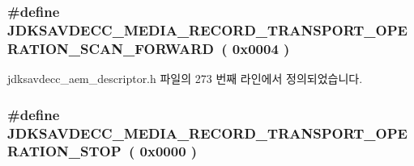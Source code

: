 \subsubsection[{\texorpdfstring{J\+D\+K\+S\+A\+V\+D\+E\+C\+C\+\_\+\+M\+E\+D\+I\+A\+\_\+\+R\+E\+C\+O\+R\+D\+\_\+\+T\+R\+A\+N\+S\+P\+O\+R\+T\+\_\+\+O\+P\+E\+R\+A\+T\+I\+O\+N\+\_\+\+S\+C\+A\+N\+\_\+\+F\+O\+R\+W\+A\+RD}{JDKSAVDECC_MEDIA_RECORD_TRANSPORT_OPERATION_SCAN_FORWARD}}]{\setlength{\rightskip}{0pt plus 5cm}\#define J\+D\+K\+S\+A\+V\+D\+E\+C\+C\+\_\+\+M\+E\+D\+I\+A\+\_\+\+R\+E\+C\+O\+R\+D\+\_\+\+T\+R\+A\+N\+S\+P\+O\+R\+T\+\_\+\+O\+P\+E\+R\+A\+T\+I\+O\+N\+\_\+\+S\+C\+A\+N\+\_\+\+F\+O\+R\+W\+A\+RD~( 0x0004 )}\hypertarget{group__media__record__transport__operation_gac1908031b1369009b8a76192fbcad065}{}\label{group__media__record__transport__operation_gac1908031b1369009b8a76192fbcad065}


jdksavdecc\+\_\+aem\+\_\+descriptor.\+h 파일의 273 번째 라인에서 정의되었습니다.

\subsubsection[{\texorpdfstring{J\+D\+K\+S\+A\+V\+D\+E\+C\+C\+\_\+\+M\+E\+D\+I\+A\+\_\+\+R\+E\+C\+O\+R\+D\+\_\+\+T\+R\+A\+N\+S\+P\+O\+R\+T\+\_\+\+O\+P\+E\+R\+A\+T\+I\+O\+N\+\_\+\+S\+T\+OP}{JDKSAVDECC_MEDIA_RECORD_TRANSPORT_OPERATION_STOP}}]{\setlength{\rightskip}{0pt plus 5cm}\#define J\+D\+K\+S\+A\+V\+D\+E\+C\+C\+\_\+\+M\+E\+D\+I\+A\+\_\+\+R\+E\+C\+O\+R\+D\+\_\+\+T\+R\+A\+N\+S\+P\+O\+R\+T\+\_\+\+O\+P\+E\+R\+A\+T\+I\+O\+N\+\_\+\+S\+T\+OP~( 0x0000 )}\hypertarget{group__media__record__transport__operation_ga816ace61621d154aa7f01a2a7f62cb23}{}\label{group__media__record__transport__operation_ga816ace61621d154aa7f01a2a7f62cb23}


